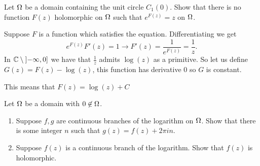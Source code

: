 \documentclass[12pt]{memoir}
\begin{document}
\begin{Ej}
    Let $\Omega$ be a domain containing the unit circle $C_1(0)$. Show that there is no function $F(z)$ holomorphic on $\Omega$ such that $e^{F(z)}=z$ on $\Omega$. 
\end{Ej}

\begin{ptcbr}
Suppose $F$ is a function which satisfies the equation. Differentiating we get 
$$e^{F(z)}F'(z)=1\to F'(z)=\frac{1}{e^{F(z)}}=\frac1z.$$
In $\mathbb{C}\setminus\left\rbrack-\infty,0\right\rbrack$ we have that $\frac{1}{z}$ admits $\log(z)$ as a primitive. So let us define $G(z)=F(z)-\log(z)$, this function has derivative $0$ so $G$ is constant.\par 
This means that $F(z)=\log(z)+C$
\end{ptcbr}
\begin{Ej}
    Let $\Omega$ be a domain with $0\not\in\Omega$.
    \begin{enumerate}
        \itemsep=-0.4em
        \item Suppose $f,g$ are continuous branches of the logarithm on $\Omega$. Show that there is some integer $n$ such that $g(z)=f(z)+2\pi i n$. 
        \item Suppose $f(z)$ is a continuous branch of the logarithm. Show that $f(z)$ is holomorphic. 
    \end{enumerate}
\end{Ej}
\end{document}
